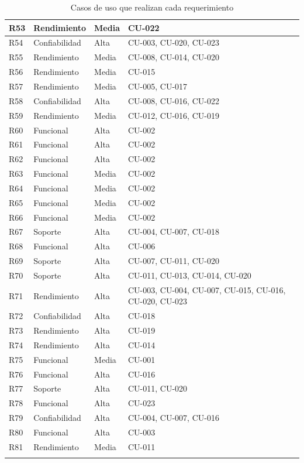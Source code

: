 \documentclass[11pt,a4paper]{article}
\DeclareRobustCommand{\_}{\textunderscore\allowbreak}
\begin{document}
\begin{center}
\begin{longtable}{|>{\raggedright\arraybackslash}p{}|>{\raggedright\arraybackslash}p{}|>{\raggedright\arraybackslash}p{}|>{\raggedright\arraybackslash}p{}|}
\hline
R53 & Rendimiento & Media & CU-022 \\
\hline
R54 & Confiabilidad & Alta & CU-003, CU-020, CU-023 \\
\hline
R55 & Rendimiento & Media & CU-008, CU-014, CU-020 \\
\hline
R56 & Rendimiento & Media & CU-015 \\
\hline
R57 & Rendimiento & Media & CU-005, CU-017 \\
\hline
R58 & Confiabilidad & Alta & CU-008, CU-016, CU-022 \\
\hline
R59 & Rendimiento & Media & CU-012, CU-016, CU-019 \\
\hline
R60 & Funcional & Alta & CU-002 \\
\hline
R61 & Funcional & Alta & CU-002 \\
\hline
R62 & Funcional & Alta & CU-002 \\
\hline
R63 & Funcional & Media & CU-002 \\
\hline
R64 & Funcional & Media & CU-002 \\
\hline
R65 & Funcional & Media & CU-002 \\
\hline
R66 & Funcional & Media & CU-002 \\
\hline
R67 & Soporte & Alta & CU-004, CU-007, CU-018 \\
\hline
R68 & Funcional & Alta & CU-006 \\
\hline
R69 & Soporte & Alta & CU-007, CU-011, CU-020 \\
\hline
R70 & Soporte & Alta & CU-011, CU-013, CU-014, CU-020 \\
\hline
R71 & Rendimiento & Alta & CU-003, CU-004, CU-007, CU-015, CU-016, CU-020, CU-023 \\
\hline
R72 & Confiabilidad & Alta & CU-018 \\
\hline
R73 & Rendimiento & Alta & CU-019 \\
\hline
R74 & Rendimiento & Alta & CU-014 \\
\hline
R75 & Funcional & Media & CU-001 \\
\hline
R76 & Funcional & Alta & CU-016 \\
\hline
R77 & Soporte & Alta & CU-011, CU-020 \\
\hline
R78 & Funcional & Alta & CU-023 \\
\hline
R79 & Confiabilidad & Alta & CU-004, CU-007, CU-016 \\
\hline
R80 & Funcional & Alta & CU-003 \\
\hline
R81 & Rendimiento & Media & CU-011 \\
\hline
\caption{Casos de uso que realizan cada requerimiento} \label{tab:traza_req_cu} \\
\end{longtable}
\end{center}
\end{document}
